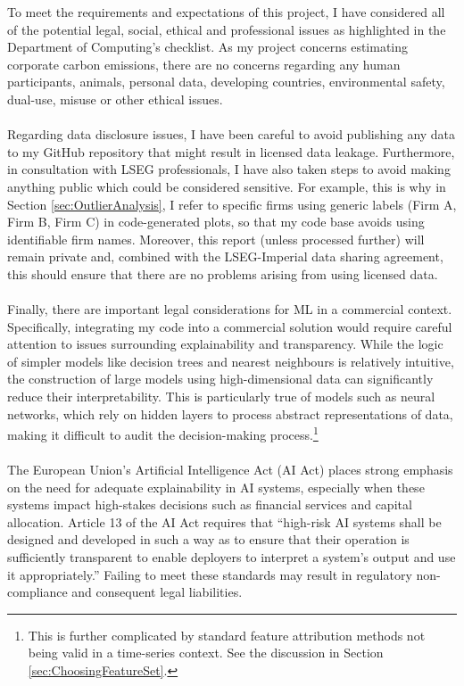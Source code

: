 \documentclass[12pt,twoside]{report}
\begin{document}
To meet the requirements and expectations of this project, I have considered all of the potential legal, social, ethical and professional issues as highlighted in the Department of Computing's checklist. As my project concerns estimating corporate carbon emissions, there are no concerns regarding any human participants, animals, personal data, developing countries, environmental safety, dual-use, misuse or other ethical issues. 
\\\\
Regarding data disclosure issues, I have been careful to avoid publishing any data to my GitHub repository that might result in licensed data leakage. Furthermore, in consultation with LSEG professionals, I have also taken steps to avoid making anything public which could be considered sensitive. For example, this is why in Section \ref{sec:OutlierAnalysis}, I refer to specific firms using generic labels (Firm A, Firm B, Firm C) in code-generated plots, so that my code base avoids using identifiable firm names. Moreover, this report (unless processed further) will remain private and, combined with the LSEG-Imperial data sharing agreement, this should ensure that there are no problems arising from using licensed data. 
\\\\
Finally, there are important legal considerations for ML in a commercial context. Specifically, integrating my code into a commercial solution would require careful attention to issues surrounding explainability and transparency. While the logic of simpler models like decision trees and nearest neighbours is relatively intuitive, the construction of large models using high-dimensional data can significantly reduce their interpretability. This is particularly true of models such as neural networks, which rely on hidden layers to process abstract representations of data, making it difficult to audit the decision-making process.\footnote{This is further complicated by standard feature attribution methods not being valid in a time-series context. See the discussion in Section \ref{sec:ChoosingFeatureSet}.}
\\\\
The European Union's Artificial Intelligence Act (AI Act) places strong emphasis on the need for adequate explainability in AI systems, especially when these systems impact high-stakes decisions such as financial services and capital allocation. Article 13 of the AI Act requires that ``high-risk AI systems shall be designed and developed in such a way as to ensure that their operation is sufficiently transparent to enable deployers to interpret a system’s output and use it appropriately.'' \cite{EU2024} Failing to meet these standards may result in regulatory non-compliance and consequent legal liabilities. 
\end{document}
